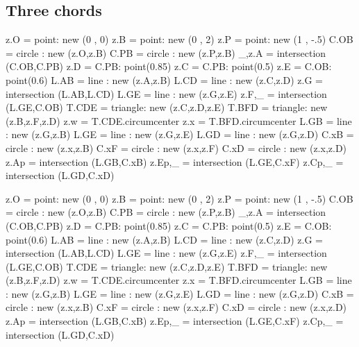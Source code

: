 \subsection{Three chords} %
\label{sub:three_chords}

\begin{tkzexample}[latex=0cm,small,code only]
\begin{tkzelements}
z.O  = point: new (0 , 0)
z.B  = point: new (0 , 2)
z.P  = point: new (1 , -.5)
C.OB = circle : new (z.O,z.B)
C.PB = circle : new (z.P,z.B)
_,z.A    = intersection (C.OB,C.PB)
z.D  = C.PB: point(0.85)
z.C  = C.PB: point(0.5)
z.E  = C.OB: point(0.6)
L.AB = line : new (z.A,z.B)
L.CD = line : new (z.C,z.D)
z.G  = intersection (L.AB,L.CD)
L.GE = line : new (z.G,z.E)
z.F,_    = intersection (L.GE,C.OB)
T.CDE    = triangle: new (z.C,z.D,z.E)
T.BFD    = triangle: new (z.B,z.F,z.D)
z.w  = T.CDE.circumcenter
z.x  = T.BFD.circumcenter
L.GB = line : new (z.G,z.B)
L.GE = line : new (z.G,z.E)
L.GD = line : new (z.G,z.D)
C.xB = circle : new (z.x,z.B)
C.xF = circle : new (z.x,z.F)
C.xD = circle : new (z.x,z.D)
z.Ap = intersection (L.GB,C.xB)
z.Ep,_   = intersection (L.GE,C.xF)
z.Cp,_   = intersection (L.GD,C.xD)
\end{tkzelements}
\end{tkzexample}

\begin{tkzelements}
z.O  = point: new (0 , 0)
z.B  = point: new (0 , 2)
z.P  = point: new (1 , -.5)
C.OB = circle : new (z.O,z.B)
C.PB = circle : new (z.P,z.B)
_,z.A    = intersection (C.OB,C.PB)
z.D  = C.PB: point(0.85)
z.C  = C.PB: point(0.5)
z.E  = C.OB: point(0.6)
L.AB = line : new (z.A,z.B)
L.CD = line : new (z.C,z.D)
z.G  = intersection (L.AB,L.CD)
L.GE = line : new (z.G,z.E)
z.F,_    = intersection (L.GE,C.OB)
T.CDE    = triangle: new (z.C,z.D,z.E)
T.BFD    = triangle: new (z.B,z.F,z.D)
z.w  = T.CDE.circumcenter
z.x  = T.BFD.circumcenter
L.GB = line : new (z.G,z.B)
L.GE = line : new (z.G,z.E)
L.GD = line : new (z.G,z.D)
C.xB = circle : new (z.x,z.B)
C.xF = circle : new (z.x,z.F)
C.xD = circle : new (z.x,z.D)
z.Ap = intersection (L.GB,C.xB)
z.Ep,_   = intersection (L.GE,C.xF)
z.Cp,_   = intersection (L.GD,C.xD)
\end{tkzelements}

